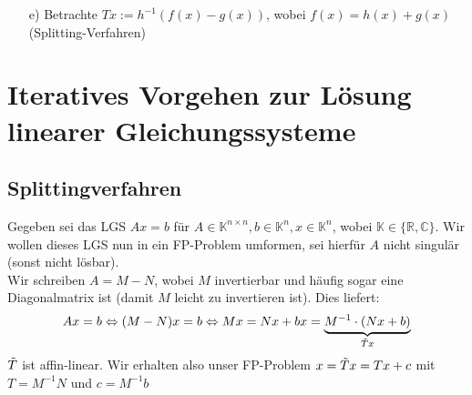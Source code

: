 \documentclass{article}
\begin{document}
\begin{enumerate}
\begin{center}
    \end{center}
    \item[e)] Betrachte $Tx:=h^{-1}(f(x)-g(x))$, wobei $f(x)=h(x)+g(x)$ (Splitting-Verfahren) 
\end{enumerate}
\section{Iteratives Vorgehen zur Lösung linearer Gleichungssysteme}
\subsection{Splittingverfahren}
Gegeben sei das LGS $Ax=b$ für $A\in\mathbb{K}^{n\times n}, b\in\mathbb{K}^n, x\in\mathbb{K}^n$, 
wobei $\mathbb{K}\in\{\mathbb{R}, \mathbb{C}\}$. Wir wollen dieses LGS nun in ein FP-Problem umformen, 
sei hierfür $A$ nicht singulär (sonst nicht lösbar). \\
Wir schreiben $A=M-N$, wobei $M$ invertierbar und häufig sogar eine Diagonalmatrix ist 
(damit $M$ leicht zu invertieren ist). Dies liefert:
\[Ax = b \Leftrightarrow (M-N)x=b \Leftrightarrow Mx=Nx+b x=\underbrace{M^{-1}\cdot(Nx+b)}_{\Tilde{T}x}\]
$\Tilde{T}$ ist affin-linear. Wir erhalten also unser FP-Problem $x=\Tilde{T}x=Tx+c$ 
mit $T=M^{-1}N$ und $c=M^{-1}b$ \\ \\
\end{document}
